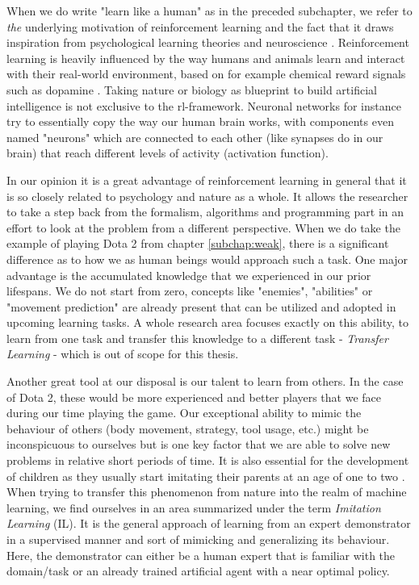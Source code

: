 When we do write "learn like a human" as in the preceded subchapter, we refer to \textit{the} underlying motivation of reinforcement learning and the fact that it draws inspiration from psychological learning theories \cite[p.~341]{Sutton1998} and neuroscience \cite[p.~377]{Sutton1998}. Reinforcement learning is heavily influenced by the way humans and animals learn and interact with their real-world environment, based on for example chemical reward signals such as dopamine \cite[p.~383]{Sutton1998}. Taking nature or biology as blueprint to build artificial intelligence is not exclusive to the rl-framework. Neuronal networks for instance try to essentially copy the way our human brain works, with components even named "neurons" which are connected to each other (like synapses do in our brain) that reach different levels of activity (activation function).
\par
In our opinion it is a great advantage of reinforcement learning in general that it is so closely related to psychology and nature as a whole. It allows the researcher to take a step back from the formalism, algorithms and programming part in an effort to look at the problem from a different perspective. When we do take the example of playing Dota 2 from chapter \ref{subchap:weak}, there is a significant difference as to how we as human beings would approach such a task. One major advantage is the accumulated knowledge that we experienced in our prior lifespans. We do not start from zero, concepts like "enemies", "abilities" or "movement prediction" are already present that can be utilized and adopted in upcoming learning tasks. A whole research area focuses exactly on this ability, to learn from one task and transfer this knowledge to a different task - \textit{Transfer Learning} - which is out of scope for this thesis.
\par
Another great tool at our disposal is our talent to learn from others. In the case of Dota 2, these would be more experienced and better players that we face during our time playing the game. Our exceptional ability to mimic the behaviour of others (body movement, strategy, tool usage, etc.) might be inconspicuous to ourselves but is one key factor that we are able to solve new problems in relative short periods of time. It is also essential for the development of children as they usually start imitating their parents at an age of one to two \cite[p.347]{wood2013whom}. When trying to transfer this phenomenon from nature into the realm of machine learning, we find ourselves in an area summarized under the term \textit{Imitation Learning} (IL). It is the general approach of learning from an expert demonstrator in a supervised manner and sort of mimicking and generalizing its behaviour. Here, the demonstrator can either be a human expert that is familiar with the domain/task or an already trained artificial agent with a near optimal policy.
